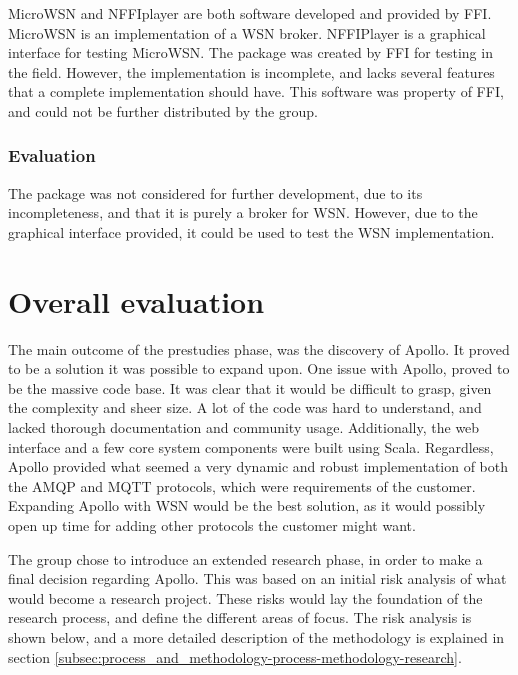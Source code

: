 MicroWSN and NFFIplayer are both software developed and provided by FFI. MicroWSN is an implementation of a WSN broker. NFFIPlayer is a graphical interface for testing MicroWSN. The package was created by FFI for testing in the field. However, the implementation is incomplete, and lacks several features that a complete implementation should have. This software was property of FFI, and could not be further distributed by the group.

\subsubsection{Evaluation}
\label{subsec:prestudies-existing_solutions-micro_wsn_and_nffiplayer-evaluation}

The package was not considered for further development, due to its incompleteness, and that it is purely a broker for WSN. However, due to the graphical interface provided, it could be used to test the WSN implementation.

\section{Overall evaluation}
\label{sec:prestudies-overall_evaluation}

The main outcome of the prestudies phase, was the discovery of Apollo. It proved to be a solution it was possible to expand upon. One issue with Apollo, proved to be the massive code base. It was clear that it would be difficult to grasp, given the complexity and sheer size. A lot of the code was hard to understand, and lacked thorough documentation and community usage. Additionally, the web interface and a few core system components were built using Scala. Regardless, Apollo provided what seemed a very dynamic and robust implementation of both the AMQP and MQTT protocols, which were requirements of the customer. Expanding Apollo with WSN would be the best solution, as it would possibly open up time for adding other protocols the customer might want.

The group chose to introduce an extended research phase, in order to make a final decision regarding Apollo. This was based on an initial risk analysis of what would become a research project. These risks would lay the foundation of the research process, and define the different areas of focus. The risk analysis is shown below, and a more detailed description of the methodology is explained in section \ref{subsec:process_and_methodology-process-methodology-research}.

